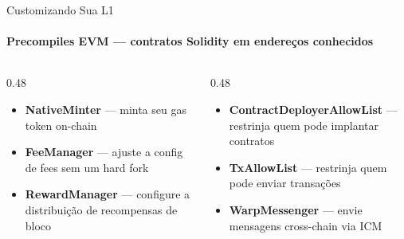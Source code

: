 \documentclass[aspectratio=169]{beamer}
\begin{document}
\begin{frame}{Customizando Sua L1}
	\framesubtitle{Precompiles EVM — contratos Solidity em endereços conhecidos}

	\begin{columns}[t]
		\begin{column}{0.48\textwidth}
			\begin{itemize}
				\item \textbf{NativeMinter} — minta seu gas token on-chain
				\item \textbf{FeeManager} — ajuste a config de fees sem um hard fork
				\item \textbf{RewardManager} — configure a distribuição de recompensas de bloco
			\end{itemize}
		\end{column}
		\begin{column}{0.48\textwidth}
			\begin{itemize}
				\item \textbf{ContractDeployerAllowList} — restrinja quem pode implantar contratos
				\item \textbf{TxAllowList} — restrinja quem pode enviar transações
				\item \textbf{WarpMessenger} — envie mensagens cross-chain via ICM
			\end{itemize}
		\end{column}
	\end{columns}

	\vspace{0.25em}
\end{frame}
\end{document}
